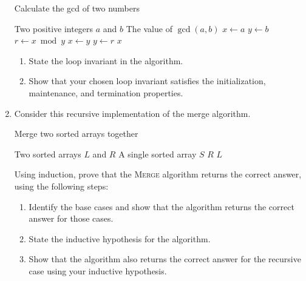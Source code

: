 \begin{exercises}
\begin{enumerate}
        \begin{algorithm}[H]
            \caption{Calculate the gcd of two numbers}
            \begin{algorithmic}[1]
                \Require Two positive integers $a$ and $b$
                \Ensure The value of $\gcd\left(a, b\right)$
                    \State $x \gets a$
                    \State $y \gets b$
                        \State $r \gets x \bmod y$
                        \State $x \gets y$
                        \State $y \gets r$
                    \EndWhile
                    \Return $x$
                \EndFunction
            \end{algorithmic}
        \end{algorithm}

        \begin{enumerate}
            \item State the loop invariant in the algorithm.
            \item Show that your chosen loop invariant satisfies the initialization, maintenance, and termination properties.
        \end{enumerate}

        \item[\challenge] Consider this recursive implementation of the merge algorithm.
        \begin{algorithm}[H]
            \caption{Merge two sorted arrays together}
            \begin{algorithmic}[1]
                \Require Two sorted arrays $L$ and $R$
                \Ensure A single sorted array $S$
                        \Return $R$
                        \Return $L$
                    \EndIf
                        \Return {}
                    \Else
                        \Return {}
                    \EndIf
                \EndFunction
            \end{algorithmic}
        \end{algorithm}

        Using induction, prove that the \textsc{Merge} algorithm returns the correct answer, using the following steps:
        \begin{enumerate}
            \item Identify the base cases and show that the algorithm returns the correct answer for those cases.
            \item State the inductive hypothesis for the algorithm.
            \item Show that the algorithm also returns the correct answer for the recursive case using your inductive hypothesis.
        \end{enumerate}


\end{enumerate}
\end{exercises}
